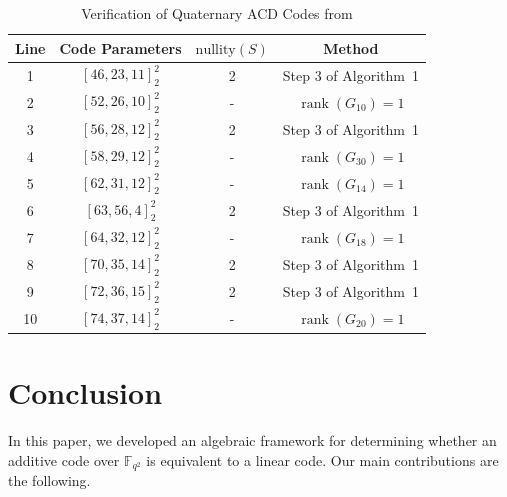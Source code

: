 \documentclass[a4paper,12pt]{article}
\theoremstyle{plain}
\theoremstyle{definition}
\begin{document}
\begin{table}[H]
\centering
\caption{Verification of Quaternary ACD Codes from \cite[Table 2]{zhu2024}}
\renewcommand{\arraystretch}{1.4}
\begin{tabular}{|c|c|c|c|}
\hline
\textbf{Line} & \textbf{Code Parameters} & $\mathrm{nullity}(S)$ & \textbf{Method} \\ \hline
1 & $[46, 23, 11]^2_2$ & 2 & Step 3 of Algorithm~1 \\ \hline
2 & $[52, 26, 10]^2_2$ & - & $\operatorname{rank}(G_{10})=1$ \\ \hline
3 & $[56, 28, 12]^2_2$ & 2 & Step 3 of Algorithm~1 \\ \hline
4 & $[58, 29, 12]^2_2$ & - & $\operatorname{rank}(G_{30})=1$ \\ \hline
5 & $[62, 31, 12]^2_2$ & - & $\operatorname{rank}(G_{14})=1$ \\ \hline
6 & $[63, 56, 4]^2_2$ & 2 & Step 3 of Algorithm~1 \\ \hline
7 & $[64, 32, 12]^2_2$ & - & $\operatorname{rank}(G_{18})=1$ \\ \hline
8 & $[70, 35, 14]^2_2$ & 2 & Step 3 of Algorithm~1 \\ \hline
9 & $[72, 36, 15]^2_2$ & 2 & Step 3 of Algorithm~1 \\ \hline
10 & $[74, 37, 14]^2_2$ & - & $\operatorname{rank}(G_{20})=1$ \\ \hline
\end{tabular}
\label{tableACDzhu}
\end{table}

\section{Conclusion}

In this paper, we developed an algebraic framework for determining whether an additive code over $\mathbb{F}_{q^2}$ is equivalent to a linear code. Our main contributions are the following.
\end{document}

